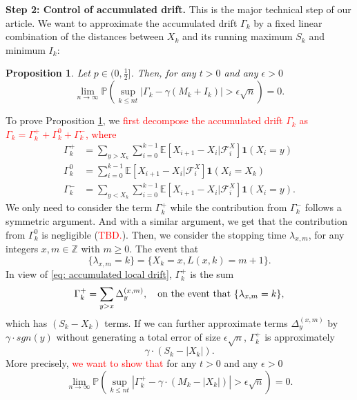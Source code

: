 \documentclass[twoside,12pt,a4paper]{article}
\newtheorem{proposition}{Proposition}[section]
\numberwithin{equation}{section}
\newcommand{\abs}[1]{\left\vert #1 \right\vert}
\newcommand\TBD{\textcolor{red}{TBD.}}
\newcommand{\edt}[1]{\textcolor{red}{#1}} %
\begin{document}
	\textbf{Step 2: Control of accumulated drift.} This is the major technical step of our article. We want to approximate the accumulated drift $\Gamma_k$ by a fixed linear combination of the distances between $X_k$ and its running maximum $S_k$ and minimum $I_k$:
	\begin{proposition}\label{lm: control of acc drift}
		Let $p\in (0,\frac{1}{2}]$. Then, for any $t>0$ and any $\epsilon >0$
		\begin{equation}\label{eq: control of acc drift}
			\lim_{n \to \infty }\mathbb{P}\left(\sup_{k\leq nt} \abs{\Gamma_k - \gamma \left(M_k + I_k \right)   } > \epsilon \sqrt{n}  \right) =0. 
		\end{equation}
	\end{proposition}
	To prove Proposition \ref{lm: control of acc drift}, we \edt{first decompose the accumulated drift $\Gamma_k$ as $\Gamma_k = 	\Gamma_k^+ +	\Gamma_k^0 + \Gamma_k^-$, where} 
	\begin{align*}
		\Gamma_k^+ &= \sum_{y > X_k} \sum_{i = 0}^{k-1} \mathbb{E}\left[ X_{i + 1} - X_i | \mathcal{F}_i^X \right] \mathbf{1}(X_i = y)\\
		\Gamma_k^0 &= \sum_{i = 0}^{k-1} \mathbb{E}\left[ X_{i + 1} - X_i | \mathcal{F}_i^X \right] \mathbf{1}(X_i = X_k) \\
		\Gamma_k^- &= \sum_{y < X_k} \sum_{i = 0}^{k-1} \mathbb{E}\left[ X_{i + 1} - X_i | \mathcal{F}_i^X \right] \mathbf{1}(X_i = y)
		.\end{align*} 
	 We only need to consider the term $\Gamma_k^+$ while the contribution from $\Gamma_k^-$ follows a symmetric argument. And with a similar argument, we get that the contribution from $\Gamma_k^0$ is negligible (\TBD).
	 Then,  we consider the stopping time $\lambda_{x,m}$, for any integers $x ,m  \in \mathbb{Z}$ with $m \geq 0$. The event that 
	 $$\{ \lambda_{x,m} =k \} = \{ X_k = x, L(x,k) =m +1  \}.  $$ 
	In view of \eqref{eq: accumulated local drift},  $\Gamma_k^+$ is the sum
	\begin{equation}
	\Gamma_k^+ = \sum_{y>x} \Delta_y^{(x,m)}, \mbox{\quad on the event that $\{ \lambda_{x,m}=k  \}$},
	\end{equation} 
	which has $(S_k - X_k)$ terms. If we can further approximate terms $\Delta_y^{(x,m)}$ by $\gamma\cdot sgn(y)$ without generating a total error of size $\epsilon \sqrt{n}$, $\Gamma_k^+$ is approximately 
	$$   
	\gamma \cdot (S_k - \abs{X_k}).
	$$
	More precisely, \edt{we want to show that} for any $t>0$ and any $\epsilon >0$
	\begin{equation}\label{eq: control of acc drift + }
		\lim_{n \to \infty }\mathbb{P}\left(\sup_{k\leq nt} \abs{\Gamma^+_k - \gamma \cdot \left(M_k - \abs{X_k} \right)   } > \epsilon \sqrt{n}  \right) =0. 
	\end{equation}
\end{document}

